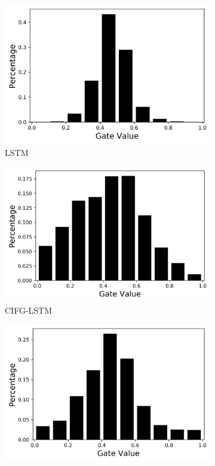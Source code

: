 \documentclass[letterpaper]{article} %
\begin{document}
\begin{figure}[h]
	\centering
	\begin{subfigure}{.48\columnwidth}
		\centering
		\includegraphics[width=\linewidth]{sample_cr_tr_input_LSTM.png}
		\caption{LSTM}
	\end{subfigure}\hfil
	\begin{subfigure}{.48\columnwidth}
		\centering
		\includegraphics[width=\linewidth]{sample_cr_tr_input_CIFGLSTM.png}
		\caption{CIFG-LSTM}
	\end{subfigure}\hfil
	\begin{subfigure}{.48\columnwidth}
		\centering
		\includegraphics[width=\linewidth]{sample_cr_tr_input_G2LSTM.png}

\end{subfigure}
\end{figure}
\end{document}
